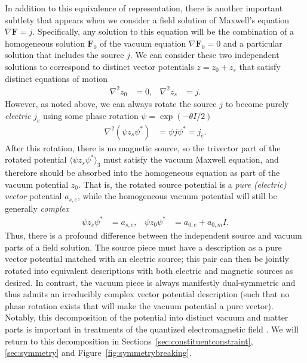 \documentclass[1p,sort&compress]{elsarticle}
\numberwithin{equation}{section}
\newcommand{\bv}[1]{\mathbf{#1}}
\newcommand{\mean}[1]{\langle #1 \rangle}
\begin{document}
In addition to this equivalence of representation, there is another important subtlety that appears when we consider a field solution of Maxwell's equation $\nabla \bv{F} = j$.  Specifically, any solution to this equation will be the combination of a homogeneous solution $\bv{F}_0$ of the vacuum equation $\nabla \bv{F}_0 = 0$ and a particular solution that includes the source $j$.  We can consider these two independent solutions to correspond to distinct vector potentials $z = z_0 + z_s$ that satisfy distinct equations of motion
\begin{align}
  \nabla^2 z_0 &= 0, & \nabla^2 z_s &= j.
\end{align}
However, as noted above, we can always rotate the source $j$ to become purely \emph{electric} $j_e$ using some phase rotation $\psi = \exp(-\theta I/2)$ 
\begin{align}
  \nabla^2 (\psi z_s \psi^*) &= \psi j \psi^* = j_e.
\end{align}
After this rotation, there is no magnetic source, so the trivector part of the rotated potential $\mean{\psi z_s \psi^*}_3$ must satisfy the vacuum Maxwell equation, and therefore should be absorbed into the homogeneous equation as part of the vacuum potential $z_0$.  That is, the rotated source potential is a \emph{pure (electric) vector} potential $a_{s,e}$, while the homogeneous vacuum potential will still be generally \emph{complex}
\begin{align}
  \psi z_s \psi^* &= a_{s,e}, & \psi z_0 \psi^* &= a_{0,e} + a_{0,m} I.
\end{align}
Thus, there is a profound difference between the independent source and vacuum parts of a field solution.  The source piece must have a description as a pure vector potential matched with an electric source; this pair can then be jointly rotated into equivalent descriptions with both electric and magnetic sources as desired.  In contrast, the vacuum piece is always manifestly dual-symmetric and thus admits an irreducibly complex vector potential description (such that no phase rotation exists that will make the vacuum potential a pure vector).  Notably, this decomposition of the potential into distinct vacuum and matter parts is important in treatments of the quantized electromagnetic field \cite{Cohen1997}.  We will return to this decomposition in Sections~\ref{sec:constituentconstraint}, \ref{sec:symmetry} and Figure~\ref{fig:symmetrybreaking}.

\end{document}
